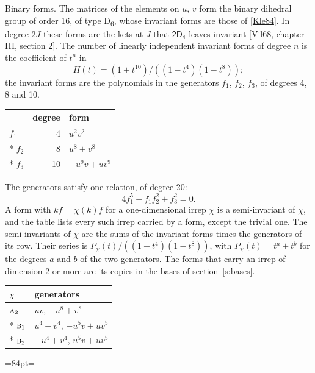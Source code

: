 \documentclass[10pt,a4paper]{article}
\makeatletter
\renewcommand\paragraph{\@startsection{paragraph}{4}{\z@}{1.5ex plus .5ex minus .2ex}{-1em}%
  {\normalfont\small\sffamily\bfseries\color{parttitle}}}
\newcommand{\needspace}[1]{\par\penalty-100\begingroup\dimen0=#1\relax\dimen2=\pagegoal
  \advance\dimen2-\pagetotal\ifdim\dimen0>\dimen2\relax\ifdim\dimen2>0pt\vfil\break\fi\fi
  \endgroup}
\numberwithin{equation}{section}
\newcommand{\grp}[1]{\mathsf{#1}}
\newcommand{\irr}[1]{\text{\normalfont\scshape #1}}
\makeatother
\begin{document}
\paragraph{Binary forms.}
The matrices of the elements on $u$, $v$ form the binary dihedral group of order 16, of type D\textsubscript{6}, whose invariant forms are those of [\href{../../../REFERENCES.pdf\#ref.Kle84}{Kle84}]. In degree $2J$ these forms are the kets at $J$ that $\grp{2D_{4}}$ leaves invariant [\href{../../../REFERENCES.pdf\#ref.Vil68}{Vil68}, chapter III, section 2]. \label{n:head.degree}\label{n:head.form}The number of linearly independent invariant forms of degree $n$ is the coefficient of $t^n$ in
\begin{equation}\label{e:molien}H(t) = (1 + t^{10})/((1-t^{4})(1-t^{8}));\end{equation}
the invariant forms are the polynomials in the generators $f_1$, $f_2$, $f_3$, of degrees 4, 8 and 10.
{\small\begin{longtable}{@{}lrl@{}}\toprule
& degree & form\\\midrule\endhead
\bottomrule\endfoot\endlastfoot
$f_{1}$ & 4 & $u^{2}v^{2}$\\*
$f_{2}$ & 8 & $u^{8} + v^{8}$\\*
$f_{3}$ & 10 & $-u^{9}v + uv^{9}$\\
\bottomrule\end{longtable}}
The generators satisfy one relation, of degree 20:
\begin{equation}\label{e:relation}4f_{1}^{5} - f_{1}f_{2}^{2} + f_{3}^{2} = 0.\end{equation}
A form with $k f = \chi(k) f$ for a one-dimensional irrep $\chi$ is a semi-invariant of $\chi$, and the table lists every such irrep carried by a form, except the trivial one. \label{n:head.generators}The semi-invariants of $\chi$ are the sums of the invariant forms times the generators of its row. Their series is $P_\chi(t)/((1-t^{4})(1-t^{8}))$, with $P_\chi(t) = t^{a} + t^{b}$ for the degrees $a$ and $b$ of the two generators. The forms that carry an irrep of dimension 2 or more are its copies in the bases of section~\ref{s:bases}.
{\small\begin{longtable}{@{}ll@{}}\toprule
$\chi$ & generators\\\midrule\endhead
\bottomrule\endfoot\endlastfoot
$\irr{a}_{2}$ & $uv$, $-u^{8} + v^{8}$\\*
$\irr{b}_{1}$ & $u^{4} + v^{4}$, $-u^{5}v + uv^{5}$\\*
$\irr{b}_{2}$ & $-u^{4} + v^{4}$, $u^{5}v + uv^{5}$\\
\bottomrule\end{longtable}}
\needspace{84pt}
\end{document}
